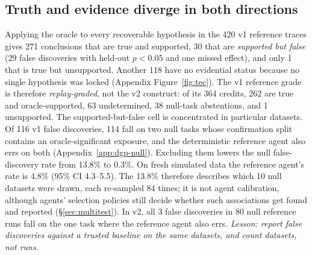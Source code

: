 \subsection{Truth and evidence diverge in both directions}
\label{sec:diverge}
Applying the oracle to every recoverable hypothesis in the 420 v1 reference
traces gives 271 conclusions that are true and supported, 30 that are
\emph{supported but false} (29 false discoveries with held-out $p<0.05$ and
one missed effect), and only 1 that is true but unsupported. Another 118 have
no evidential status because no single hypothesis was locked
(Appendix Figure~\ref{fig:tec}). The v1 reference grade is therefore \emph{replay-graded}, not the v2
construct: of its 364 credits, 262 are true and oracle-supported, 63
undetermined, 38 null-task abstentions, and 1 unsupported. The supported-but-false cell is concentrated in particular
datasets. Of 116 v1
false discoveries, 114 fall on two null tasks whose confirmation split
contains an oracle-significant exposure, and the deterministic reference agent
also errs on both (Appendix~\ref{app:dgp-null}). Excluding them lowers the
null false-discovery rate from 13.8\% to 0.3\%. On fresh simulated data the
reference agent's rate is 4.8\% (95\% CI 4.3--5.5). The 13.8\% therefore
describes which 10 null datasets were drawn, each re-sampled 84 times; it is
not agent calibration, although agents' selection policies still decide
whether such associations get found and reported (\S\ref{sec:multitest}). In v2, all 3 false discoveries in 80 null reference
runs fall on the one task where the reference agent also errs.
\emph{Lesson: report false discoveries against a trusted baseline on the same
datasets, and count datasets, not runs.}

